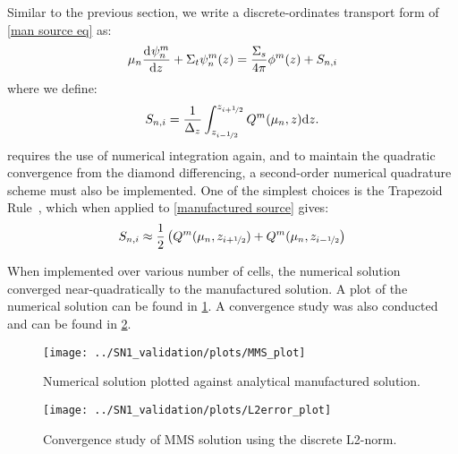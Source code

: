\documentclass{NE515}
\theoremstyle{definition}
\begin{document}
    Similar to the previous section, we write a discrete-ordinates transport form of \cref{man source eq} as:
    \begin{equation}
        \mu_n \dv[]{\psi_{n}^m}{z}+\Sigma_t \psi_n ^m (z)=\frac{\Sigma_s}{4\pi}\phi^m(z) + S_{n,i}
    \end{equation}
    where we define:
    \begin{equation}
        \label{manufactured source}
        S_{n,i}=\frac{1}{\Delta _z}\int_{z_{i-\nicefrac{1}{2}}}^{z_{i+\nicefrac{1}{2}}}Q^m(\mu_n,z)\dd z.
    \end{equation}
     requires the use of numerical integration again, and to maintain the quadratic convergence from the diamond differencing, a second-order numerical quadrature scheme must also be implemented.
    One of the simplest choices is the Trapezoid Rule~\cite{gezerlisNumericalMethodsPhysicsa}, which when applied to \cref{manufactured source} gives:
    \begin{equation}
        S_{n,i}\approx\frac{1}{2}\left( Q^m(\mu_n,z_{i+\nicefrac{1}{2}})+Q^m(\mu_n,z_{i-\nicefrac{1}{2}} \right)
    \end{equation}

    When implemented over various number of cells, the numerical solution converged near-quadratically to the manufactured solution.
    A plot of the numerical solution can be found in \cref{true-solution-convergence}.
    A convergence study was also conducted and can be found in \cref{convergence-study}.


    \begin{figure}[!htb]
        \centering
        \texttt{[image: ../SN1\_validation/plots/MMS\_plot]}
        \caption{Numerical solution plotted against analytical manufactured solution.}
        \label{true-solution-convergence}
    \end{figure}

    \begin{figure}[!htb]
        \centering
        \texttt{[image: ../SN1\_validation/plots/L2error\_plot]}
        \caption{Convergence study of MMS solution using the discrete L2-norm.}
        \label{convergence-study}
    \end{figure}
\end{document}
